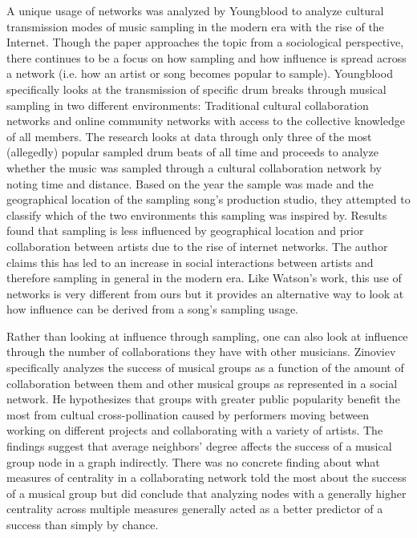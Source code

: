 \documentclass[pageno]{jpaper}
\begin{document}
A unique usage of networks was analyzed by Youngblood to analyze cultural transmission modes of music sampling in the modern era with the rise of the Internet. Though the paper approaches the topic from a sociological perspective, there continues to be a focus on how sampling and how influence is spread across a network (i.e. how an artist or song becomes popular to sample). Youngblood specifically looks at the transmission of specific drum breaks through musical sampling in two different environments: Traditional cultural collaboration networks and online community networks with access to the collective knowledge of all members. The research looks at data through only three of the most (allegedly) popular sampled drum beats of all time and proceeds to analyze whether the music was sampled through a cultural collaboration network by noting time and distance. Based on the year the sample was made and the geographical location of the sampling song's production studio, they attempted to classify which of the two environments this sampling was inspired by. Results found that sampling is less influenced by geographical location and prior collaboration between artists due to the rise of internet networks. The author claims this has led to an increase in social interactions between artists and therefore sampling in general in the modern era. Like Watson's work, this use of networks is very different from ours but it provides an alternative way to look at how influence can be derived from a song's sampling usage.
\cite{Youngblood}

Rather than looking at influence through sampling, one can also look at influence through the number of collaborations they have with other musicians. Zinoviev specifically analyzes the success of musical groups as a function of the amount of collaboration between them and other musical groups as represented in a social network. He hypothesizes that groups with greater public popularity benefit the most from cultual cross-pollination caused by performers moving between working on different projects and collaborating with a variety of artists. The findings suggest that average neighbors' degree affects the success of a musical group node in a graph indirectly. There was no concrete finding about what measures of centrality in a collaborating network told the most about the success of a musical group but did conclude that analyzing nodes with a generally higher centrality across multiple measures generally acted as a better predictor of a success than simply by chance. 
\cite{Zinoviev}
\end{document}
